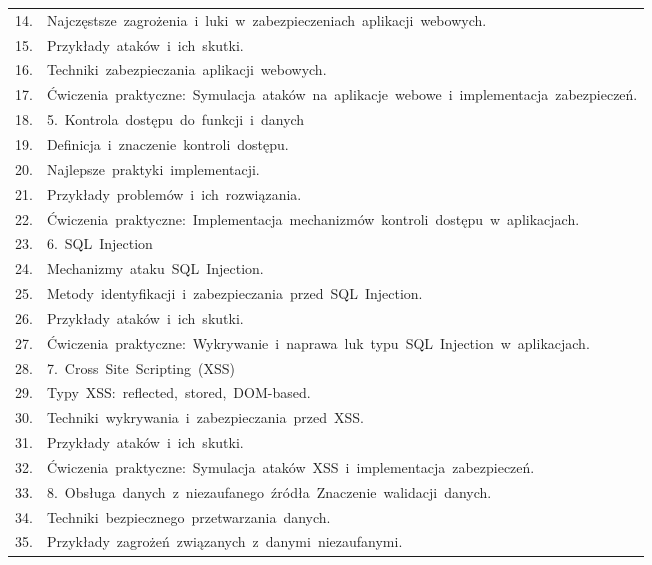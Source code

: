 \documentclass[12pt, a4paper]{article}
\begin{document}
{\begin{longtable}{m{1.5cm}m{14.5cm}}
  \rowcolor{tableRowAlt} 14. & Najczęstsze zagrożenia i luki w zabezpieczeniach aplikacji webowych. \\
  \rowcolor{tableRowLight} 15. & Przykłady ataków i ich skutki. \\
  \rowcolor{tableRowAlt} 16. & Techniki zabezpieczania aplikacji webowych. \\
  \rowcolor{tableRowLight} 17. & Ćwiczenia praktyczne: Symulacja ataków na aplikacje webowe i implementacja zabezpieczeń. \\
  \rowcolor{tableRowAlt} 18. & 5. Kontrola dostępu do funkcji i danych \\
  \rowcolor{tableRowLight} 19. & Definicja i znaczenie kontroli dostępu. \\
  \rowcolor{tableRowAlt} 20. & Najlepsze praktyki implementacji. \\
  \rowcolor{tableRowLight} 21. & Przykłady problemów i ich rozwiązania. \\
  \rowcolor{tableRowAlt} 22. & Ćwiczenia praktyczne: Implementacja mechanizmów kontroli dostępu w aplikacjach. \\
  \rowcolor{tableRowLight} 23. & 6. SQL Injection \\
  \rowcolor{tableRowAlt} 24. & Mechanizmy ataku SQL Injection. \\
  \rowcolor{tableRowLight} 25. & Metody identyfikacji i zabezpieczania przed SQL Injection. \\
  \rowcolor{tableRowAlt} 26. & Przykłady ataków i ich skutki. \\
  \rowcolor{tableRowLight} 27. & Ćwiczenia praktyczne: Wykrywanie i naprawa luk typu SQL Injection w aplikacjach. \\
  \rowcolor{tableRowAlt} 28. & 7. Cross Site Scripting (XSS) \\
  \rowcolor{tableRowLight} 29. & Typy XSS: reflected, stored, DOM-based. \\
  \rowcolor{tableRowAlt} 30. & Techniki wykrywania i zabezpieczania przed XSS. \\
  \rowcolor{tableRowLight} 31. & Przykłady ataków i ich skutki. \\
  \rowcolor{tableRowAlt} 32. & Ćwiczenia praktyczne: Symulacja ataków XSS i implementacja zabezpieczeń. \\
  \rowcolor{tableRowLight} 33. & 8. Obsługa danych z niezaufanego źródła Znaczenie walidacji danych. \\
  \rowcolor{tableRowAlt} 34. & Techniki bezpiecznego przetwarzania danych. \\
  \rowcolor{tableRowLight} 35. & Przykłady zagrożeń związanych z danymi niezaufanymi. \\

\end{longtable}}
\end{document}
